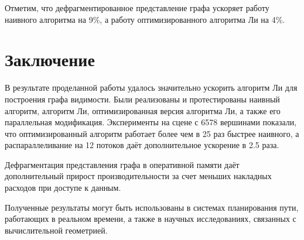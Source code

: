 \documentclass{article}
\theoremstyle{definition}
\begin{document}
Отметим, что дефрагментированное представление графа ускоряет работу наивного алгоритма на 9\%,
а работу оптимизированного алгоритма Ли на 4\%.

\section*{Заключение}

В результате проделанной работы удалось значительно ускорить алгоритм Ли для построения графа видимости.
Были реализованы и протестированы наивный алгоритм, алгоритм Ли, оптимизированная версия алгоритма Ли, а также его параллельная модификация.
Эксперименты на сцене с 6578 вершинами показали, что оптимизированный алгоритм работает более чем в 25 раз быстрее наивного,
а распараллеливание на 12 потоков даёт дополнительное ускорение в 2.5 раза.

Дефрагментация представления графа в оперативной памяти даёт дополнительный прирост производительности 
за счет меньших накладных расходов при доступе к данным.

Полученные результаты могут быть использованы в системах планирования пути, работающих в реальном времени,
а также в научных исследованиях, связанных с вычислительной геометрией.
\newpage
\end{document}
